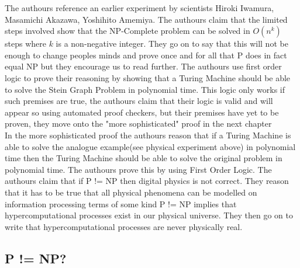 \documentclass{report}
\begin{document}
The authours reference an earlier experiment by scientists Hiroki Iwamura, Masamichi Akazawa, Yoshihito Amemiya\cite{Iwamura}.  The authours claim that the limited steps involved show that the NP-Complete problem can be solved in $O(n^k)$ steps where $k$ is a non-negative integer.  They go on to say that this will not be enough to change peoples minds and prove once and for all that P does in fact equal NP but they encourage us to read further.  The authours use first order logic to prove their reasoning by showing that a Turing Machine should be able to solve the Stein Graph Problem\cite{Steiner} in polynomial time.  This logic only works if such premises are true, the authours claim that their logic is valid and will appear so using automated proof checkers, but their premises have yet to be proven, they move onto the "more sophisticated" proof in the next chapter\cite{PVsNPSolved}
\\
In the more sophisticated proof the authours reason that if a Turing Machine is able to solve the analogue example(see physical experiment above) in polynomial time then the Turing Machine should be able to solve the original problem in polynomial time.  The authours prove this by using First Order Logic\cite{Logic}.  The authours claim that if P != NP then digital physics\cite{Zuse} is not correct.  They reason that it has to be true that all physical phenomena can be modelled on information processing terms of some kind P != NP implies that hypercomputational processes\cite{} exist in our physical universe.  They then go on to write that hypercomputational processes are never physically real.
\subsection{P != NP?}
\end{document}

